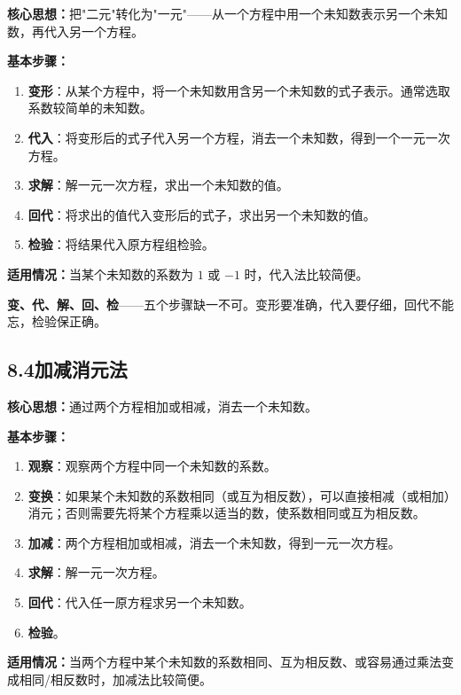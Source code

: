 \documentclass[12pt, a4paper]{ctexart}
\begin{document}
\begin{knowledgebox}[代入消元法]
\textbf{核心思想：}把"二元"转化为"一元"——从一个方程中用一个未知数表示另一个未知数，再代入另一个方程。

\medskip
\textbf{基本步骤：}
\begin{enumerate}[leftmargin=1.5em]
  \item \textbf{变形}：从某个方程中，将一个未知数用含另一个未知数的式子表示。通常选取系数较简单的未知数。
  \item \textbf{代入}：将变形后的式子代入另一个方程，消去一个未知数，得到一个一元一次方程。
  \item \textbf{求解}：解一元一次方程，求出一个未知数的值。
  \item \textbf{回代}：将求出的值代入变形后的式子，求出另一个未知数的值。
  \item \textbf{检验}：将结果代入原方程组检验。
\end{enumerate}

\medskip
\textbf{适用情况：}当某个未知数的系数为 $1$ 或 $-1$ 时，代入法比较简便。
\end{knowledgebox}

\begin{tipbox}[代入消元法口诀]
\textbf{变、代、解、回、检}——五个步骤缺一不可。变形要准确，代入要仔细，回代不能忘，检验保正确。
\end{tipbox}

\subsection*{8.4\quad 加减消元法}

\begin{knowledgebox}[加减消元法]
\textbf{核心思想：}通过两个方程相加或相减，消去一个未知数。

\medskip
\textbf{基本步骤：}
\begin{enumerate}[leftmargin=1.5em]
  \item \textbf{观察}：观察两个方程中同一个未知数的系数。
  \item \textbf{变换}：如果某个未知数的系数相同（或互为相反数），可以直接相减（或相加）消元；否则需要先将某个方程乘以适当的数，使系数相同或互为相反数。
  \item \textbf{加减}：两个方程相加或相减，消去一个未知数，得到一元一次方程。
  \item \textbf{求解}：解一元一次方程。
  \item \textbf{回代}：代入任一原方程求另一个未知数。
  \item \textbf{检验}。
\end{enumerate}

\medskip
\textbf{适用情况：}当两个方程中某个未知数的系数相同、互为相反数、或容易通过乘法变成相同/相反数时，加减法比较简便。
\end{knowledgebox}
\end{document}
